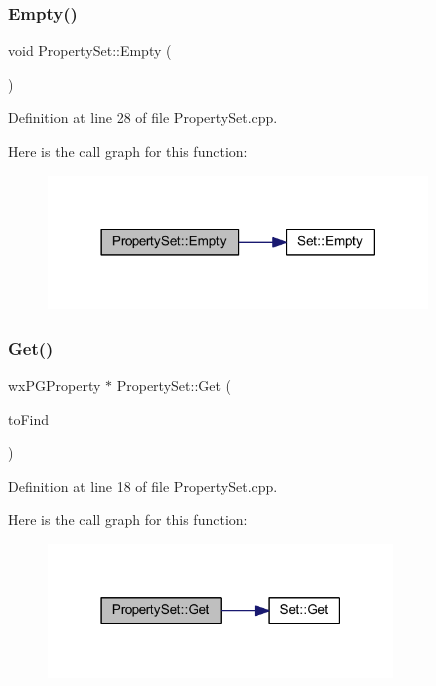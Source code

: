 \subsubsection{\texorpdfstring{Empty()}{Empty()}}
{\footnotesize\ttfamily void Property\+Set\+::\+Empty (\begin{DoxyParamCaption}{ }\end{DoxyParamCaption})}



Definition at line 28 of file Property\+Set.\+cpp.

Here is the call graph for this function\+:
\nopagebreak
\begin{figure}[H]
\begin{center}
\leavevmode
\includegraphics[width=285pt]{class_property_set_a158da716546ca640cd81ffb555bcfddc_cgraph}
\end{center}
\end{figure}
\mbox{\label{class_property_set_abfdeede5db336610ec5936a57ec3c2fe}} 
\subsubsection{\texorpdfstring{Get()}{Get()}}
{\footnotesize\ttfamily wx\+P\+G\+Property $\ast$ Property\+Set\+::\+Get (\begin{DoxyParamCaption}\item[{wx\+P\+G\+Property $\ast$}]{to\+Find }\end{DoxyParamCaption})}



Definition at line 18 of file Property\+Set.\+cpp.

Here is the call graph for this function\+:
\nopagebreak
\begin{figure}[H]
\begin{center}
\leavevmode
\includegraphics[width=259pt]{class_property_set_abfdeede5db336610ec5936a57ec3c2fe_cgraph}
\end{center}
\end{figure}
\mbox{\label{class_property_set_aece224749884f449d1afda598d468b41}} 
